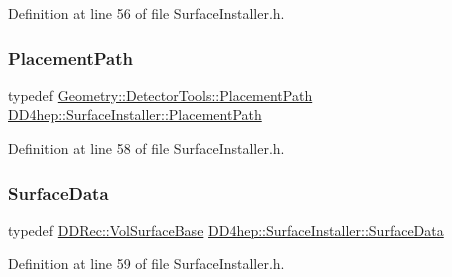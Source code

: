 Definition at line 56 of file Surface\+Installer.\+h.

\hypertarget{class_d_d4hep_1_1_surface_installer_a73ea611f3129bed899d4282cd126c4e5}{}\label{class_d_d4hep_1_1_surface_installer_a73ea611f3129bed899d4282cd126c4e5} 
\subsubsection{\texorpdfstring{Placement\+Path}{PlacementPath}}
{\footnotesize\ttfamily typedef \hyperlink{namespace_d_d4hep_1_1_geometry_1_1_detector_tools_a6cc33285199e04dd336a33e6e62925e6}{Geometry\+::\+Detector\+Tools\+::\+Placement\+Path} \hyperlink{class_d_d4hep_1_1_surface_installer_a73ea611f3129bed899d4282cd126c4e5}{D\+D4hep\+::\+Surface\+Installer\+::\+Placement\+Path}\hspace{0.3cm}{\ttfamily [protected]}}



Definition at line 58 of file Surface\+Installer.\+h.

\hypertarget{class_d_d4hep_1_1_surface_installer_adf9b9c7ac69d57dd6e262891e925be3c}{}\label{class_d_d4hep_1_1_surface_installer_adf9b9c7ac69d57dd6e262891e925be3c} 
\subsubsection{\texorpdfstring{Surface\+Data}{SurfaceData}}
{\footnotesize\ttfamily typedef \hyperlink{class_d_d4hep_1_1_d_d_rec_1_1_vol_surface_base}{D\+D\+Rec\+::\+Vol\+Surface\+Base} \hyperlink{class_d_d4hep_1_1_surface_installer_adf9b9c7ac69d57dd6e262891e925be3c}{D\+D4hep\+::\+Surface\+Installer\+::\+Surface\+Data}\hspace{0.3cm}{\ttfamily [protected]}}



Definition at line 59 of file Surface\+Installer.\+h.

\hypertarget{class_d_d4hep_1_1_surface_installer_a16346209b86955ff4a4a380c3ce1bcd2}{}\label{class_d_d4hep_1_1_surface_installer_a16346209b86955ff4a4a380c3ce1bcd2} 
